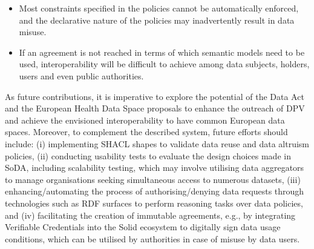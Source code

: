 \begin{itemize}
    \item Most constraints specified in the policies cannot be automatically enforced, and the declarative nature of the policies may inadvertently result in data misuse.
    \item If an agreement is not reached in terms of which semantic models need to be used, interoperability will be difficult to achieve among data subjects, holders, users and even public authorities.
\end{itemize}

As future contributions, it is imperative to explore the potential of the Data Act and the European Health Data Space proposals to enhance the outreach of DPV and achieve the envisioned interoperability to have common European data spaces.
Moreover, to complement the described system, future efforts should include:
(i) implementing SHACL shapes to validate data reuse and data altruism policies,
(ii) conducting usability tests to evaluate the design choices made in SoDA, including scalability testing, which may involve utilising data aggregators to manage organisations seeking simultaneous access to numerous datasets,
(iii) enhancing/automating the process of authorising/denying data requests through technologies such as RDF surfaces \citep{hochstenbach_rdf_2023} to perform reasoning tasks over data policies, and 
(iv) facilitating the creation of immutable agreements, e.g., by integrating Verifiable Credentials into the Solid ecosystem \citep{braun_attributebased_2022} to digitally sign data usage conditions, which can be utilised by authorities in case of misuse by data users.